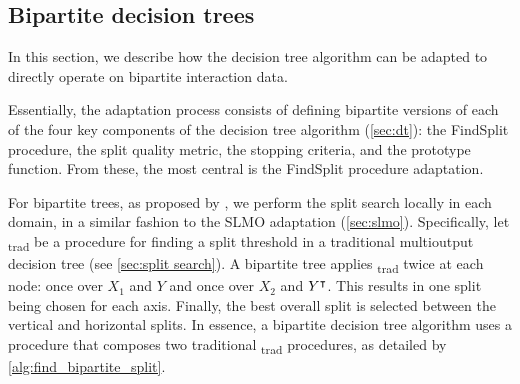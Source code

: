 

\subsection{Bipartite decision trees}
\label{sec:bipartite_trees}

In this section, we describe how the decision tree algorithm can be adapted to directly operate on bipartite interaction data.

Essentially, the adaptation process consists of defining bipartite versions of each of the four key components of the decision tree algorithm (\autoref{sec:dt}): the FindSplit procedure, the split quality metric, the stopping criteria, and the prototype function. From these, the most central is the FindSplit procedure adaptation.
 
For bipartite trees, as proposed by \cite{pliakos2018global}, we perform the split search locally in each domain, in a similar fashion to the SLMO adaptation (\autoref{sec:slmo}).
%
%
Specifically, let \FindSplit\textsubscript{trad} be a procedure for finding a split threshold in a traditional multioutput decision tree (see \autoref{sec:split search}).
A bipartite tree applies \FindSplit\textsubscript{trad} twice at each node: once over $X_1$ and $Y$ and once over $X_2$ and $Y^\intercal$. This results in one split being chosen for each axis.
Finally, the best overall split is selected between the vertical and horizontal splits.
In essence, a bipartite decision tree algorithm uses a \FindSplit procedure that composes two traditional \FindSplit\textsubscript{trad} procedures, as detailed by \autoref{alg:find_bipartite_split}.

